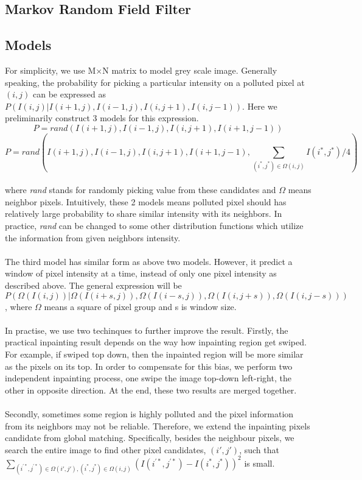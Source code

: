 \documentclass[a4paper]{article}
\begin{document}
\begin{spacing}{1.4}
\section{Markov Random Field Filter}
\subsection{Models}
For simplicity, we use M$\times$N matrix to model grey scale image. Generally speaking, the probability for picking a particular intensity on a polluted pixel at $(i, j)$ can be expressed as $P(I(i, j) | I(i+1, j), I(i-1, j), I(i, j+1), I(i, j-1))$. Here we preliminarily construct 3 models for this expression.\\
$$P = rand(I(i+1, j), I(i-1, j), I(i, j+1), I(i+1, j-1))$$
$$P = rand(I(i+1, j), I(i-1, j), I(i, j+1), I(i+1, j-1), \sum\limits_{(i^*, j^*)\in \Omega(i, j)} I(i^*, j^*)/4) $$
~\\
where \emph{rand} stands for randomly picking value from these candidates and $\Omega$ means neighbor pixels. Intuitively, these 2 models means polluted pixel should has relatively large probability to share similar intensity with its neighbors. In practice, \emph{rand} can be changed to some other distribution functions which utilize the information from given neighbors intensity. \\
~\\
The third model has similar form as above two models. However, it predict a window of pixel intensity at a time, instead of only one pixel intensity as described above. The general expression will be  $P(\Omega(I(i, j)) | \Omega(I(i+s, j)), \Omega(I(i-s, j)), \Omega(I(i, j+s)), \Omega(I(i, j-s)))$, where $\Omega$ means a square of pixel group and s is window size. \\
~\\ 
In practise, we use two techinques to further improve the result. Firstly, the practical inpainting result depends on the way how inpainting region get swiped. For example, if swiped top down, then the inpainted region will be more similar as the pixels on its top. In order to compensate for this bias, we perform two independent inpainting process, one swipe the image top-down left-right, the other in opposite direction. At the end, these two results are merged together.\\
~\\
Secondly, sometimes some region is highly polluted and the pixel information from its neighbors may not be reliable. Therefore, we extend the inpainting pixels candidate from global matching. Specifically, besides the neighbour pixels, we search the entire image to find other pixel candidates, $(i',j')$, such that $ \sum\limits_{(i^{'*}, j^{'*})\in \Omega(i', j'), (i^{*}, j^{*})\in \Omega(i, j)} (I(i^{'*}, j^{'*})-I(i^*, j^*))^2$ is small.\\

\end{spacing}
\end{document}
